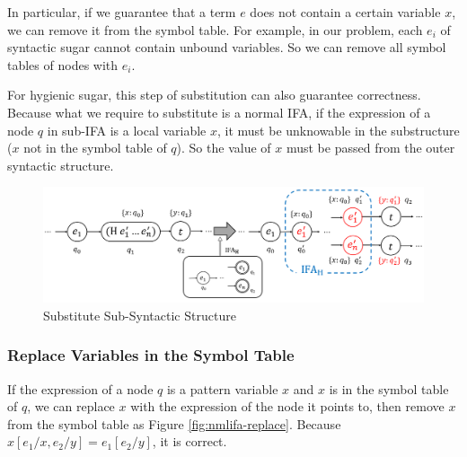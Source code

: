 In particular, if we guarantee that a term $e$ does not contain a certain variable $x$, we can remove it from the symbol table. For example, in our problem, each $e_i$ of syntactic sugar cannot contain unbound variables. So we can remove all symbol tables of nodes with $e_i$.

For hygienic sugar, this step of substitution can also guarantee correctness. Because what we require to substitute is a normal IFA, if the expression of a node $q$ in sub-IFA is a local variable $x$, it must be unknowable in the substructure ($x$ not in the symbol table of $q$). So the value of $x$ must be passed from the outer syntactic structure.

\begin{figure}[t]
    \centering
    \includegraphics[scale=0.25]{images/nmlifa/nmlifa-subst.png}
    \caption{Substitute Sub-Syntactic Structure}
    \label{fig:nmlifa-subst}
\end{figure}

\subsubsection{Replace Variables in the Symbol Table}

If the expression of a node $q$ is a pattern variable $x$ and $x$ is in the symbol table of $q$, we can replace $x$ with the expression of the node it points to, then remove $x$ from the symbol table as Figure \ref{fig:nmlifa-replace}. Because $x[e_1/x, e_2/y]=e_1[e_2/y]$, it is correct.

